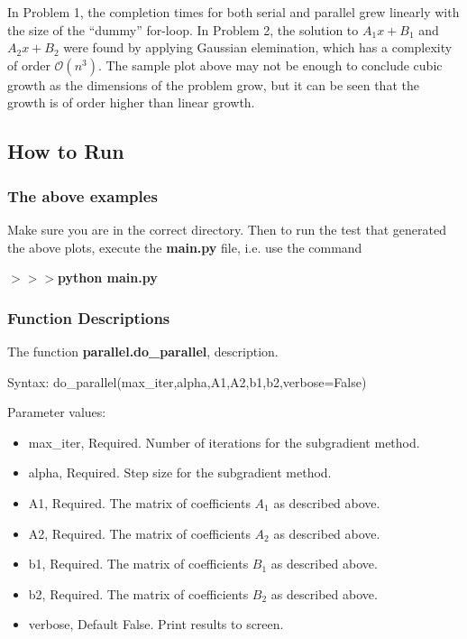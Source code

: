 \documentclass[12pt]{article}
\begin{document}
In Problem 1, the completion times for both serial and parallel grew linearly with the size of the ``dummy'' for-loop. In Problem 2, the solution to $A_1x+B_1$ and $A_2x+B_2$ were found by applying Gaussian elemination, which has a complexity of order $\mathcal{O}(n^3)$. The sample plot above may not be enough to conclude cubic growth as the dimensions of the problem grow, but it can be seen that the growth is of order higher than linear growth.


\subsection*{How to Run}

\subsubsection*{The above examples}

Make sure you are in the correct directory. Then to run the test that generated the above plots, execute the \textbf{main.py} file, i.e. use the command

\noindent \textbf{$>>>$python main.py}

\subsubsection*{Function Descriptions}

\noindent The function \textbf{parallel.do\_parallel}, description.

Syntax: do\_parallel(max\_iter,alpha,A1,A2,b1,b2,verbose=False)

Parameter values:
\begin{itemize}
	\item max\_iter, Required. Number of iterations for the subgradient method.
	\item alpha, Required. Step size for the subgradient method.
	\item A1, Required. The matrix of coefficients $A_1$ as described above.
	\item A2, Required. The matrix of coefficients $A_2$ as described above.
	\item b1, Required. The matrix of coefficients $B_1$ as described above.
	\item b2, Required. The matrix of coefficients $B_2$ as described above.
	\item verbose, Default False. Print results to screen.
\end{itemize}
\end{document}

